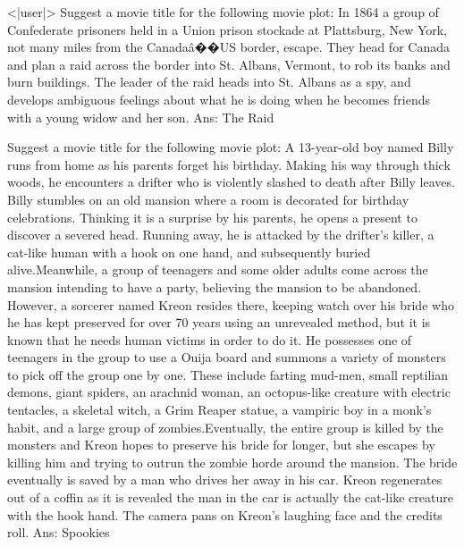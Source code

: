 \documentclass{article}
\begin{document}
\begin{tcolorbox}[colframe=black,colback=white]
<|user|>
Suggest a movie title for the following movie plot: In 1864 a group of Confederate prisoners held in a Union prison stockade at Plattsburg, New York, not many miles from the Canadaâ��US border, escape. They head for Canada and plan a raid across the border into St. Albans, Vermont, to rob its banks and burn buildings. The leader of the raid heads into St. Albans as a spy, and develops ambiguous feelings about what he is doing when he becomes friends with a young widow and her son.
Ans: The Raid

Suggest a movie title for the following movie plot: A 13-year-old boy named Billy runs from home as his parents forget his birthday. Making his way through thick woods, he encounters a drifter who is violently slashed to death after Billy leaves. Billy stumbles on an old mansion where a room is decorated for birthday celebrations. Thinking it is a surprise by his parents, he opens a present to discover a severed head. Running away, he is attacked by the drifter's killer, a cat-like human with a hook on one hand, and subsequently buried alive.Meanwhile, a group of teenagers and some older adults come across the mansion intending to have a party, believing the mansion to be abandoned. However, a sorcerer named Kreon resides there, keeping watch over his bride who he has kept preserved for over 70 years using an unrevealed method, but it is known that he needs human victims in order to do it. He possesses one of teenagers in the group to use a Ouija board and summons a variety of monsters to pick off the group one by one. These include farting mud-men, small reptilian demons, giant spiders, an arachnid woman, an octopus-like creature with electric tentacles, a skeletal witch, a Grim Reaper statue, a vampiric boy in a monk's habit, and a large group of zombies.Eventually, the entire group is killed by the monsters and Kreon hopes to preserve his bride for longer, but she escapes by killing him and trying to outrun the zombie horde around the mansion. The bride eventually is saved by a man who drives her away in his car. Kreon regenerates out of a coffin as it is revealed the man in the car is actually the cat-like creature with the hook hand. The camera pans on Kreon's laughing face and the credits roll.
Ans: Spookies


\end{tcolorbox}
\end{document}

